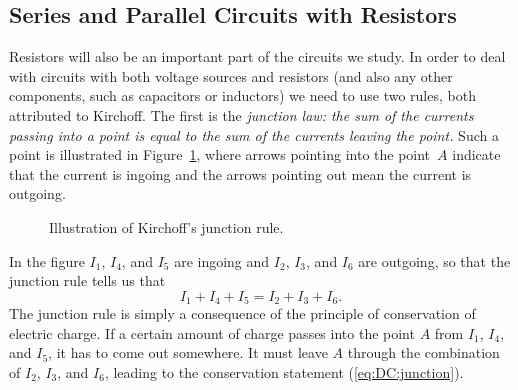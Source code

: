 \subsection{Series and Parallel Circuits with Resistors}

Resistors will also be an important part of the circuits we study.  In order
to deal with circuits with both voltage sources and resistors (and also any
other components, such as capacitors or inductors) we need to use two rules,
both attributed to Kirchoff.  The first is the {\it junction law: the sum of 
the currents passing into a point is equal to the sum of the currents leaving 
the point.} Such a point is illustrated in Figure~\ref{fig:DC:junction}, where 
arrows pointing into the point~$A$ indicate that the current is ingoing and 
the arrows pointing out mean the current is outgoing. 
\begin{figure}
\centerline{\epsfxsize=4cm }
\caption{Illustration of Kirchoff's junction rule.}
\label{fig:DC:junction}
\end{figure}
In the figure $I_1$, $I_4$, and $I_5$ are ingoing and $I_2$, $I_3$, and $I_6$ 
are outgoing, so that the junction rule tells us that
\begin{equation}
I_1+I_4+I_5=I_2+I_3+I_6. \label{eq:DC:junction}
\end{equation}  
The junction rule is simply a consequence of the principle of conservation of 
electric charge.  If a certain amount of charge passes into the point $A$ from
$I_1$, $I_4$, and $I_5$, it has to come out somewhere. It must leave $A$ 
through the combination of $I_2$, $I_3$, and $I_6$, leading to the conservation
statement (\ref{eq:DC:junction}). 

